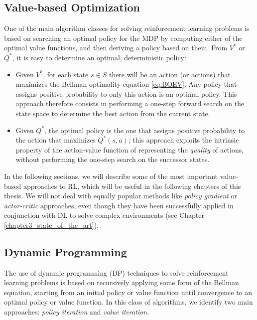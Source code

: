 \subsection{Value-based Optimization} \label{s:value_based_optimization}
One of the main algorithm classes for solving reinforcement learning problems
is based on searching an optimal policy for the MDP by computing either 
of the optimal value functions, and then deriving a policy based on them.
From $V^*$ or $Q^*$, it is easy to determine an optimal, deterministic policy:
\begin{itemize}
    \item Given $V^*$, for each state $s \in S$ there will be an action (or 
    actions) that maximizes the Bellman optimality equation \eqref{eq:BOEV}. 
    Any policy that assigns positive probability to only this action is an 
    optimal policy.
    This approach therefore consists in performing a one-step forward search on 
    the state space to determine the best action from the current state.
    \item Given $Q^*$, the optimal policy is the one that assigns positive 
    probability to the action that maximizes $Q^*(s, a)$; this approach 
    exploits the intrinsic property of the action-value function of representing 
    the \textit{quality} of actions, without performing the one-step search 
    on the successor states. 
\end{itemize}

In the following sections, we will describe some of the most important 
value-based approaches to RL, which will be useful in the following chapters of 
this thesis. 
We will not deal with equally popular methods like \textit{policy gradient} or 
\textit{actor-critic} approaches, even though they have been successfully 
applied in conjunction with DL to solve complex environments (see Chapter 
\ref{chapter3_state_of_the_art}).

\subsection{Dynamic Programming}
The use of dynamic programming (DP) techniques to solve reinforcement learning 
problems is based on recursively applying some form of the Bellman equation, 
starting from an initial policy or value function until convergence to an 
optimal policy or value function.
In this class of algorithms, we identify two main approaches: \textit{policy 
iteration} and \textit{value iteration}.

